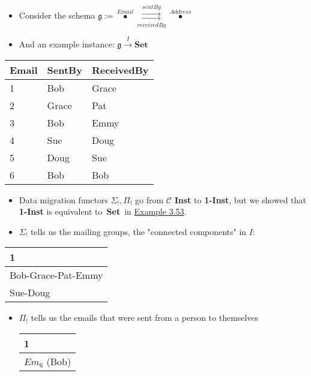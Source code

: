 \begin{itemize}
    \item  Consider the schema $\mathfrak{g} := \boxed{\overset{Email}\bullet \overset{sentBy}{\underset{receivedBy}{\rightrightarrows}} \overset{Address}\bullet}$
    \item And an example instance: $\mathfrak{g}\xrightarrow{I}\mathbf{Set}$
  \end{itemize}

  \begin{minipage}{0.48\textwidth}
    \begin{tabular}{|l|l|l|}
      \hline
      Email & SentBy & ReceivedBy \\ \hline
      1     & Bob    & Grace      \\ \hline
      2     & Grace  & Pat        \\ \hline
      3     & Bob    & Emmy       \\ \hline
      4     & Sue    & Doug       \\ \hline
      5     & Doug   & Sue        \\ \hline
      6     & Bob    & Bob        \\ \hline
    \end{tabular}
  \end{minipage}

  \begin{itemize}
    \item Data migration functors $\Sigma_!,\Pi_!$ go from $\mathcal{C}$ \textbf{Inst} to \textbf{1-Inst}, but we showed that \textbf{1-Inst} is equivalent to \,\textbf{Set}\, in \href{doc/1 math/Seven Sketches in Compositionality/Chapter 3: Databases/3 Functors, natural transformations, and databases/4 Natural transformations/5 Natural transformation to unit}{Example 3.53}.
    \item $\Sigma_!$ tells us the mailing groups, the "connected components" in $I$:
  \end{itemize}

  \begin{minipage}{0.48\textwidth}
    \begin{tabular}{|l|}
      \hline
      1                  \\ \hline
      Bob-Grace-Pat-Emmy \\ \hline
      Sue-Doug           \\ \hline
    \end{tabular}
  \end{minipage}

  \begin{itemize}
    \item $\Pi_!$ tells us the emails that were sent from a person to themselves

          \begin{minipage}{0.48\textwidth}
            \begin{tabular}{|l|}
              \hline
              1            \\ \hline
              $Em_6$ (Bob) \\ \hline
            \end{tabular}
          \end{minipage}

  \end{itemize}